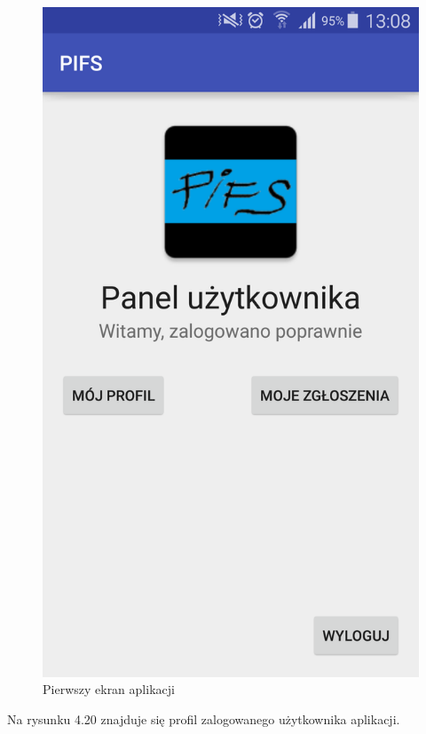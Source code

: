 \documentclass[a4paper,11pt]{article}
\begin{document}
\begin{figure}[h!]
	\centering
	\includegraphics[width=\textwidth,height=0.6\textheight]{logowaniePolski.png}
	\caption{Pierwszy ekran aplikacji}
\end{figure}

Na rysunku 4.20 znajduje się profil zalogowanego użytkownika aplikacji.
\end{document}

